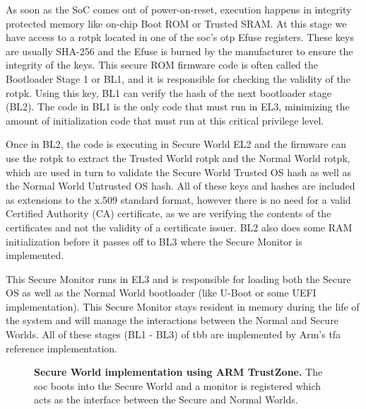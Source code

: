 As soon as the SoC comes out of power-on-reset, execution happens in integrity protected memory like on-chip Boot ROM or Trusted SRAM. At this stage we have access to a \gls{rotpk} located in one of the \gls{soc}'s \gls{otp} Efuse registers. These keys are usually SHA-256 and the Efuse is burned by the manufacturer to ensure the integrity of the keys. This secure ROM firmware code is often called the Bootloader Stage 1 or BL1, and it is responsible for checking the validity of the \gls{rotpk}. Using this key, BL1 can verify the hash of the next bootloader stage (BL2). The code in BL1 is the only code that must run in EL3, minimizing the amount of initialization code that must run at this critical privilege level.

Once in BL2, the code is executing in Secure World EL2 and the firmware can use the \gls{rotpk} to extract the Trusted World \gls{rotpk} and the Normal World \gls{rotpk}, which are used in turn to validate the Secure World Trusted OS hash as well as the Normal World Untrusted OS hash. All of these keys and hashes are included as extensions to the x.509 standard format, however there is no need for a valid Certified Authority (CA) certificate, as we are verifying the contents of the certificates and not the validity of a certificate issuer. BL2 also does some RAM initialization before it passes off to BL3 where the Secure Monitor is implemented.

This Secure Monitor runs in EL3 and is responsible for loading both the Secure OS as well as the Normal World bootloader (like U-Boot or some UEFI implementation). This Secure Monitor stays resident in memory during the life of the system and will manage the interactions between the Normal and Secure Worlds. All of these stages (BL1 - BL3) of \gls{tbb} are implemented by Arm's \gls{tfa} reference implementation.

\begin{figure}[ht]
\makebox[\textwidth][c]{
}\caption[Arm TrustZone Example of Normal and Secure World]{\textbf{Secure World implementation using ARM TrustZone.}
The \gls{soc} boots into the Secure World and a monitor is registered which acts as the interface between the Secure and Normal Worlds.
\label{fig:trustzone}}
\end{figure}

